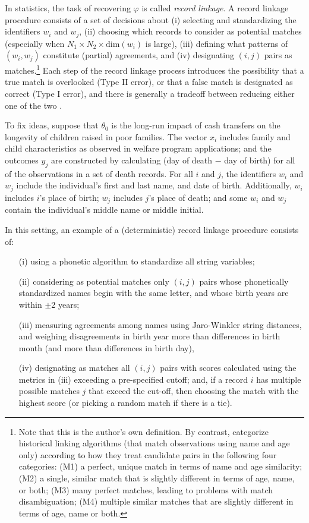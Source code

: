 \documentclass[12pt]{article}
\begin{document}
In statistics, the task of recovering $\varphi$ is called \textit{record linkage}.  A record linkage procedure consists of a set of decisions about (i) selecting and standardizing the identifiers $w_i$ and $w_j$, (ii) choosing which records to consider as potential matches (especially when $N_1 \times N_2 \times \text{dim}(w_i) $ is large), (iii) defining what patterns of $(w_i,w_j)$ constitute (partial) agreements, and (iv) designating $(i,j)$ pairs as matches.\footnote{Note that this is the author's own definition.  By contrast, \cite{bailey2017} categorize historical linking algorithms (that match observations using name and age only) according to how they treat candidate pairs in the following four categories: (M1) a perfect, unique match in terms of name and age similarity; (M2) a single, similar match that is slightly different in terms of age, name, or both; (M3) many perfect matches, leading to problems with match disambiguation; (M4) multiple similar matches that are slightly different in terms of age, name or both.} Each step of the record linkage process introduces the possibility that a true match is overlooked (Type II error), or that a false match is designated as correct (Type I error), and there is generally a tradeoff between reducing either one of the two \citep{abe2019, harron2018}.

To fix ideas, suppose that $\theta_0$ is the long-run impact of cash transfers on the longevity of children raised in poor families.  The vector $x_i$ includes family and child characteristics as observed in welfare program applications; and the outcomes $y_j$ are constructed by calculating (day of death $-$ day of birth) for all of the observations in a set of death records.  For all $i$ and $j$, the identifiers $w_i$ and $w_j$ include the individual's first and last name, and date of birth.  Additionally, $w_i$ includes $i$'s place of birth; $w_j$ includes $j$'s place of death; and some $w_i$ and $w_j$ contain the individual's middle name or middle initial. 

In this setting, an example of a (deterministic) record linkage procedure consists of: 
\begin{enumerate}
\item[(i)] using a phonetic algorithm to standardize all string variables; 
\item[(ii)] considering as potential matches only $(i,j)$ pairs whose phonetically standardized names begin with the same letter, and whose birth years are within $\pm$2 years;
\item[(iii)] measuring agreements among names using Jaro-Winkler string distances, and weighing disagreements in birth year more than differences in birth month (and more than differences in birth day), 
\item[(iv)] designating as matches all $(i,j)$ pairs with scores calculated using the metrics in (iii) exceeding a pre-specified cutoff; and, if a record $i$ has multiple possible matches $j$ that exceed the cut-off, then choosing the match with the highest score (or picking a random match if there is a tie).  
\end{enumerate}
\end{document}
